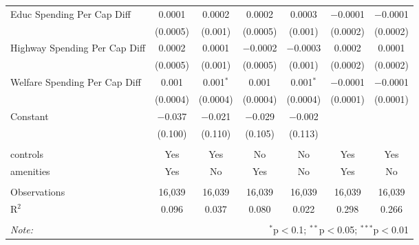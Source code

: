 \begin{table}[!htbp]
\begin{tabular}{@{\extracolsep{5pt}}lcccccc}
  Educ Spending Per Cap Diff & 0.0001 & 0.0002 & 0.0002 & 0.0003 & $-$0.0001 & $-$0.0001 \\ 
  & (0.0005) & (0.001) & (0.0005) & (0.001) & (0.0002) & (0.0002) \\ 
  Highway Spending Per Cap Diff & 0.0002 & 0.0001 & $-$0.0002 & $-$0.0003 & 0.0002 & 0.0001 \\ 
  & (0.0005) & (0.001) & (0.0005) & (0.001) & (0.0002) & (0.0002) \\ 
  Welfare Spending Per Cap Diff & 0.001 & 0.001$^{*}$ & 0.001 & 0.001$^{*}$ & $-$0.0001 & $-$0.0001 \\ 
  & (0.0004) & (0.0004) & (0.0004) & (0.0004) & (0.0001) & (0.0001) \\ 
  Constant & $-$0.037 & $-$0.021 & $-$0.029 & $-$0.002 &  &  \\ 
  & (0.100) & (0.110) & (0.105) & (0.113) &  &  \\ 
 \hline \\[-1.8ex] 
controls & Yes & Yes & No & No & Yes & Yes \\ 
amenities & Yes & No & Yes & No & Yes & No \\ 
\hline \\[-1.8ex] 
Observations & 16,039 & 16,039 & 16,039 & 16,039 & 16,039 & 16,039 \\ 
R$^{2}$ & 0.096 & 0.037 & 0.080 & 0.022 & 0.298 & 0.266 \\ 
\hline 
\hline \\[-1.8ex] 
\textit{Note:}  & \multicolumn{6}{r}{$^{*}$p$<$0.1; $^{**}$p$<$0.05; $^{***}$p$<$0.01} \\ 
\end{tabular} 
\end{table} 
